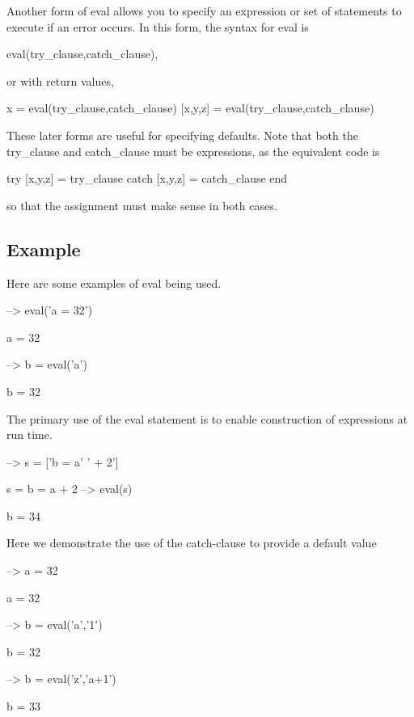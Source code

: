 Another form of {\ttfamily eval} allows you to specify an expression or set of statements to execute if an error occurs. In this form, the syntax for {\ttfamily eval} is \begin{DoxyVerb}   eval(try_clause,catch_clause),
\end{DoxyVerb}
 or with return values, \begin{DoxyVerb}   x = eval(try_clause,catch_clause)
   [x,y,z] = eval(try_clause,catch_clause)
\end{DoxyVerb}
 These later forms are useful for specifying defaults. Note that both the {\ttfamily try\-\_\-clause} and {\ttfamily catch\-\_\-clause} must be expressions, as the equivalent code is \begin{DoxyVerb}  try
    [x,y,z] = try_clause
  catch
    [x,y,z] = catch_clause
  end
\end{DoxyVerb}
 so that the assignment must make sense in both cases. \hypertarget{variables_struct_Example}{}\subsection{Example}\label{variables_struct_Example}
Here are some examples of {\ttfamily eval} being used.


\begin{DoxyVerbInclude}
--> eval('a = 32')

a = 
 32 

--> b = eval('a')

b = 
 32 
\end{DoxyVerbInclude}


The primary use of the {\ttfamily eval} statement is to enable construction of expressions at run time.


\begin{DoxyVerbInclude}
--> s = ['b = a' ' + 2']

s = 
b = a + 2
--> eval(s)

b = 
 34 
\end{DoxyVerbInclude}


Here we demonstrate the use of the catch-\/clause to provide a default value


\begin{DoxyVerbInclude}
--> a = 32

a = 
 32 

--> b = eval('a','1')

b = 
 32 

--> b = eval('z','a+1')

b = 
 33 
\end{DoxyVerbInclude}


